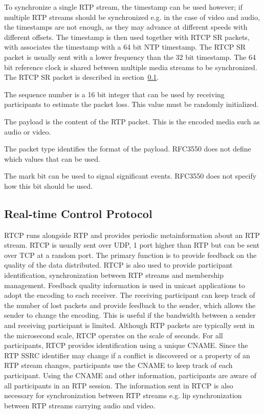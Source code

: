 To synchronize a single RTP stream, the timestamp can be used however; if multiple RTP streams should be synchronized e.g. in the case of video and audio, the timestamps are not enough, as they may advance at different speeds with different offsets. The timestamp is then used together with RTCP SR packets, with associates the timestamp with a 64 bit NTP timestamp. The RTCP SR packet is usually sent with a lower frequency than the 32 bit timestamp. The 64 bit reference clock is shared between multiple media streams to be synchronized. The RTCP SR packet is described in section~\ref{sec:design:rtcp}.


The sequence number is a 16 bit integer that can be used by receiving participants to estimate the packet loss. This value must be randomly initialized.

The payload is the content of the RTP packet. This is the encoded media such as audio or video. 

The packet type identifies the format of the payload. RFC3550 does not define which values that can be used.


The mark bit can be used to signal significant events. RFC3550 does not specify how this bit should be used.



\subsection{Real-time Control Protocol} \label{sec:design:rtcp}
RTCP runs alongside RTP and provides periodic metainformation about an RTP stream. RTCP is usually sent over UDP, 1 port higher than RTP but can be sent over TCP at a random port. The primary function is to provide feedback on the quality of the data distributed. RTCP is also used to provide participant identification, synchronization between RTP streams and membership management. Feedback quality information is used in unicast applications to adopt the encoding to each receiver. The receiving participant can keep track of the number of lost packets and provide feedback to the sender, which allows the sender to change the encoding. This is useful if the bandwidth between a sender and receiving participant is limited.  Although RTP packets are typically sent in the microsecond scale, RTCP operates on the scale of seconds.
For all participants, RTCP provides identification using a unique \ac{CNAME}.
Since the RTP SSRC identifier may change if a conflict is discovered or a property of an RTP stream changes, participants use the CNAME to keep track of each participant. Using the \ac{CNAME} and other information, participants are aware of all participants in an RTP session.
The information sent in RTCP is also necessary for synchronization between RTP streams e.g. lip synchronization between RTP streams carrying audio and video.

